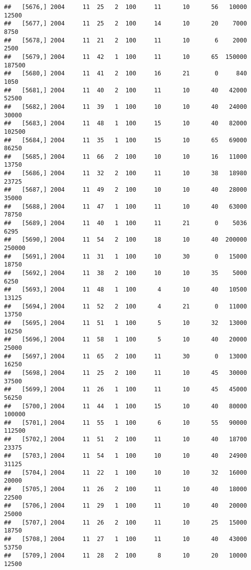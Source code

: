 \documentclass{article}\usepackage[]{graphicx}\usepackage[]{color}
\makeatletter
\newenvironment{kframe}{%
 \def\at@end@of@kframe{}%
 \ifinner\ifhmode%
  \def\at@end@of@kframe{\end{minipage}}%
  \begin{minipage}{\columnwidth}%
 \fi\fi%
 \def\FrameCommand##1{\hskip\@totalleftmargin \hskip-\fboxsep
 \colorbox{shadecolor}{##1}\hskip-\fboxsep
     \hskip-\linewidth \hskip-\@totalleftmargin \hskip\columnwidth}%
 \MakeFramed {\advance\hsize-\width
   \@totalleftmargin\z@ \linewidth\hsize
   \@setminipage}}%
 {\par\unskip\endMakeFramed%
 \at@end@of@kframe}
\newenvironment{knitrout}{}{} %
\makeatother
\begin{document}
\begin{knitrout}
\begin{kframe}
\begin{verbatim}
##   [5676,] 2004     11  25   2  100     11      10      56   10000   12500
##   [5677,] 2004     11  25   2  100     14      10      20    7000    8750
##   [5678,] 2004     11  21   2  100     11      10       6    2000    2500
##   [5679,] 2004     11  42   1  100     11      10      65  150000  187500
##   [5680,] 2004     11  41   2  100     16      21       0     840    1050
##   [5681,] 2004     11  40   2  100     11      10      40   42000   52500
##   [5682,] 2004     11  39   1  100     10      10      40   24000   30000
##   [5683,] 2004     11  48   1  100     15      10      40   82000  102500
##   [5684,] 2004     11  35   1  100     15      10      65   69000   86250
##   [5685,] 2004     11  66   2  100     10      10      16   11000   13750
##   [5686,] 2004     11  32   2  100     11      10      38   18980   23725
##   [5687,] 2004     11  49   2  100     10      10      40   28000   35000
##   [5688,] 2004     11  47   1  100     11      10      40   63000   78750
##   [5689,] 2004     11  40   1  100     11      21       0    5036    6295
##   [5690,] 2004     11  54   2  100     18      10      40  200000  250000
##   [5691,] 2004     11  31   1  100     10      30       0   15000   18750
##   [5692,] 2004     11  38   2  100     10      10      35    5000    6250
##   [5693,] 2004     11  48   1  100      4      10      40   10500   13125
##   [5694,] 2004     11  52   2  100      4      21       0   11000   13750
##   [5695,] 2004     11  51   1  100      5      10      32   13000   16250
##   [5696,] 2004     11  58   1  100      5      10      40   20000   25000
##   [5697,] 2004     11  65   2  100     11      30       0   13000   16250
##   [5698,] 2004     11  25   2  100     11      10      45   30000   37500
##   [5699,] 2004     11  26   1  100     11      10      45   45000   56250
##   [5700,] 2004     11  44   1  100     15      10      40   80000  100000
##   [5701,] 2004     11  55   1  100      6      10      55   90000  112500
##   [5702,] 2004     11  51   2  100     11      10      40   18700   23375
##   [5703,] 2004     11  54   1  100     10      10      40   24900   31125
##   [5704,] 2004     11  22   1  100     10      10      32   16000   20000
##   [5705,] 2004     11  26   2  100     11      10      40   18000   22500
##   [5706,] 2004     11  29   1  100     11      10      40   20000   25000
##   [5707,] 2004     11  26   2  100     11      10      25   15000   18750
##   [5708,] 2004     11  27   1  100     11      10      40   43000   53750
##   [5709,] 2004     11  28   2  100      8      10      20   10000   12500

\end{verbatim}
\end{kframe}
\end{knitrout}
\end{document}
